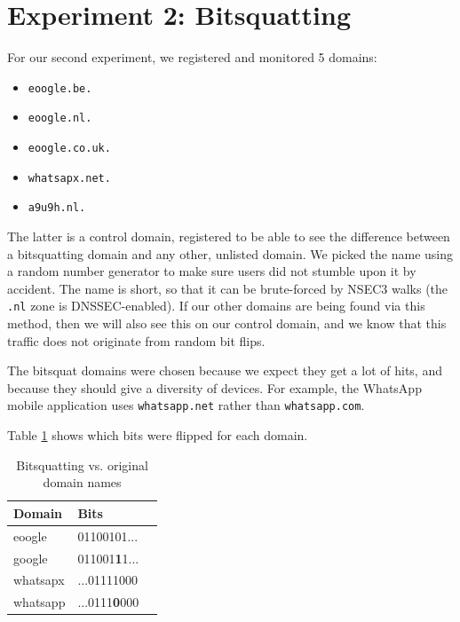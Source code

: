 \documentclass[conference]{IEEEtran}
\begin{document}
\section{Experiment 2: Bitsquatting}

For our second experiment, we registered and monitored 5 domains:

\begin{itemize}
  \item \texttt{eoogle.be.}
  \item \texttt{eoogle.nl.}
  \item \texttt{eoogle.co.uk.}
  \item \texttt{whatsapx.net.}
  \item \texttt{a9u9h.nl.}
\end{itemize}

The latter is a control domain, registered to be able to see the difference
between a bitsquatting domain and any other, unlisted domain. We picked the
name using a random number generator to make sure users did not stumble upon it
by accident. The name is short, so that it can be brute-forced by NSEC3 walks
(the \texttt{.nl} zone is DNSSEC-enabled). If our other domains are being found
via this method, then we will also see this on our control domain, and we know
that this traffic does not originate from random bit flips.

The bitsquat domains were chosen because we expect they get a lot of hits, and
because they should give a diversity of devices. For example, the WhatsApp
mobile application uses \texttt{whatsapp.net} rather than
\texttt{whatsapp.com}.

Table \ref{tab:bits} shows which bits were flipped for each domain.

\begin{table}[H]
  \centering
  \caption{Bitsquatting vs. original domain names}
  \label{tab:bits}
  \begin{tabular}{|l|l|l|}
    \hline
    \textbf{Domain}   & \textbf{Bits} \\ \hline
    eoogle   & 01100101... \\ \hline
    google   & 011001\textbf{1}1... \\ \hline
    whatsapx & ...01111000 \\ \hline
    whatsapp & ...0111\textbf{0}000 \\ \hline
   \end{tabular}
\end{table}
\end{document}
